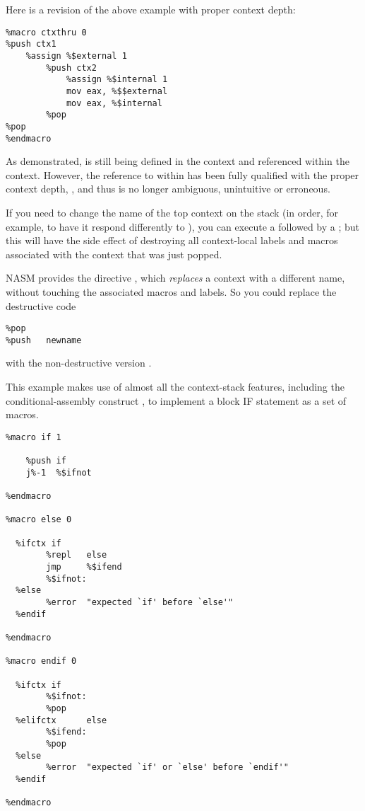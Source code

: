 Here is a revision of the above example with proper context depth:

\begin{lstlisting}
%macro ctxthru 0
%push ctx1
    %assign %$external 1
        %push ctx2
            %assign %$internal 1
            mov eax, %$$external
            mov eax, %$internal
        %pop
%pop
%endmacro
\end{lstlisting}

As demonstrated,  is still being defined in the 
context and referenced within the  context. However, the
reference to  within  has been fully qualified with
the proper context depth, , and thus is no longer ambiguous,
unintuitive or erroneous.


If you need to change the name of the top context on the stack (in
order, for example, to have it respond differently to ),
you can execute a  followed by a ; but this will
have the side effect of destroying all context-local labels and
macros associated with the context that was just popped.

NASM provides the directive , which \emph{replaces} a context
with a different name, without touching the associated macros and
labels. So you could replace the destructive code

\begin{lstlisting}
%pop
%push   newname
\end{lstlisting}

with the non-destructive version .


This example makes use of almost all the context-stack features,
including the conditional-assembly construct , to
implement a block IF statement as a set of macros.

\begin{lstlisting}
%macro if 1

    %push if
    j%-1  %$ifnot

%endmacro

%macro else 0

  %ifctx if
        %repl   else
        jmp     %$ifend
        %$ifnot:
  %else
        %error  "expected `if' before `else'"
  %endif

%endmacro

%macro endif 0

  %ifctx if
        %$ifnot:
        %pop
  %elifctx      else
        %$ifend:
        %pop
  %else
        %error  "expected `if' or `else' before `endif'"
  %endif

%endmacro
\end{lstlisting}

